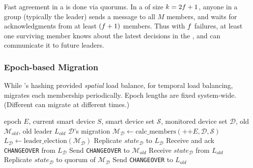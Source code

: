 \label{comesh:subsection:quorum}

 Fast agreement in a \kgroup{} is done via quorums. In a \kgroup{} of size $k=2f+1$, anyone in a group (typically the leader) sends a message to all $M$ members, and waits for acknowledgments from at least $(f+1)$ members. Thus with $f$ failures, at least one surviving \kgroup{} member knows about the latest decisions in the \kgroup{}, and can communicate it to future leaders.

\subsubsection{Epoch-based \Kgroup{} Migration}
\label{comesh:subsection:periodicity}

While 's hashing provided  {\it spatial} load balance, for temporal load balancing, \sysname{}  migrates each \kgroup{} membership periodically.
Epoch lengths are fixed system-wide. (Different \kgroups{} can migrate at different times.)

\begin{algorithm}[t]
    \footnotesize
    \caption{\small \sysname{} \Kgroup{} Migration}
    \label{comesh:alg:migration}
    \begin{algorithmic}[1]
        \Require epoch $E$, current smart device $S$, smart device set $\mathcal{S}$, monitored device set $\mathcal{D}$, old \kgroup{} $\mathcal{M}_{old}$, old leader $L_{old}$
        \Ensure $\mathcal{D}$'s \kgroup{} migration
        \State $\mathcal{M}_{\mathcal{D}} \gets \text{calc\_members}(\text{++}E,\mathcal{D},\mathcal{S})$ 
        \State $L_{\mathcal{D}} \gets \text{leader\_election}(\mathcal{M}_{\mathcal{D}})$
            \State Replicate $state_{\mathcal{D}}$ to $L_{\mathcal{D}}$ 
            \State Receive and ack \texttt{CHANGEOVER} from $L_{\mathcal{D}}$  \label{comesh:alg:migration:e}
            \State Send \texttt{CHANGEOVER} to $\mathcal{M}_{old}$   \label{comesh:alg:migration:f}
            \State Receive $state_{\mathcal{D}}$ from $L_{old}$ 
            \State Replicate $state_{\mathcal{D}}$ to quorum of $\mathcal{M}_{\mathcal{D}}$ 
            \State Send \texttt{CHANGEOVER} to $L_{old}$ 
        \EndIf
    \end{algorithmic}
\end{algorithm}

